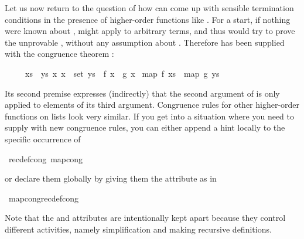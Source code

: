 \begin{isabellebody}
\begin{isamarkuptext}
Let us now return to the question of how  can come up with
sensible termination conditions in the presence of higher-order functions
like . For a start, if nothing were known about ,
 might apply  to arbitrary terms, and thus
 would try to prove the unprovable , without any assumption about .  Therefore
 has been supplied with the congruence theorem
:
\begin{isabelle}%
\ \ \ \ \ {\isasymlbrakk}xs\ {\isacharequal}\ ys{\isacharsemicolon}\ {\isasymAnd}x{\isachardot}\ x\ {\isasymin}\ set\ ys\ {\isasymLongrightarrow}\ f\ x\ {\isacharequal}\ g\ x{\isasymrbrakk}\isanewline
\isaindent{\ \ \ \ \ }{\isasymLongrightarrow}\ map\ f\ xs\ {\isacharequal}\ map\ g\ ys%
\end{isabelle}
Its second premise expresses (indirectly) that the second argument of
 is only applied to elements of its third argument. Congruence
rules for other higher-order functions on lists look very similar. If you get
into a situation where you need to supply  with new
congruence rules, you can either append a hint locally
to the specific occurrence of %
\end{isamarkuptext}%
{\isacharparenleft}\ recdef{\isacharunderscore}cong{\isacharcolon}\ map{\isacharunderscore}cong{\isacharparenright}%
\begin{isamarkuptext}%
\noindent
or declare them globally
by giving them the  attribute as in%
\end{isamarkuptext}%
\ map{\isacharunderscore}cong{\isacharbrackleft}recdef{\isacharunderscore}cong{\isacharbrackright}%
\begin{isamarkuptext}%
Note that the  and  attributes are
intentionally kept apart because they control different activities, namely
simplification and making recursive definitions.
\end{isamarkuptext}%
\end{isabellebody}%
